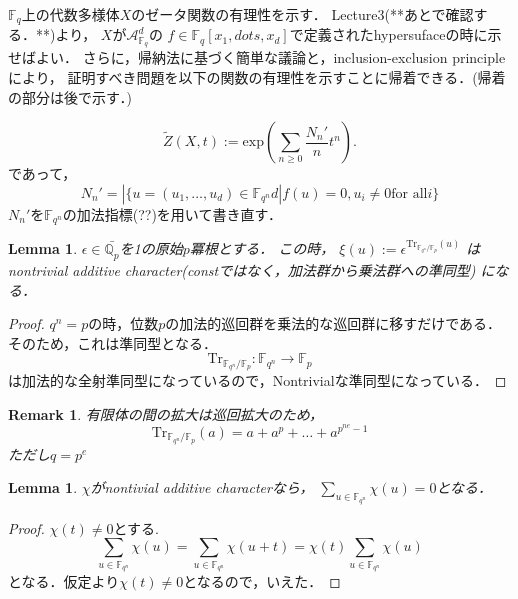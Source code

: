 \documentclass{ujarticle}
\newtheorem{lem}[thm]{Lemma}
\newtheorem*{rem}{Remark}
\begin{document}
$\mathbb{F}_q$上の代数多様体$X$のゼータ関数の有理性を示す．
Lecture3(**あとで確認する．**)より，
$X$が$\mathcal{A}_{\mathbb{F}_q}^d$の
$f \in \mathbb{F}_  q[x_1,dots,x_d]$で定義されたhypersufaceの時に示せばよい．
さらに，帰納法に基づく簡単な議論と，inclusion-exclusion principleにより，
証明すべき問題を以下の関数の有理性を示すことに帰着できる．(帰着の部分は後で示す．)

\begin{equation*}
 \tilde{Z}(X,t):= \mathrm{exp}(\sum_{n \ge 0}\frac{N_n'}{n}t^n).
\end{equation*}
であって，
\begin{equation*}
 N_n'=|\{u= (u_1,\dots,u_d) \in \mathbb{F}_{q^n}d | f(u)=0,u_i \neq 0
 \mbox{for all}i\}
\end{equation*}
$N_n'$を$\mathbb{F}_{q^n}$の加法指標(??)を用いて書き直す．

\begin{lem}
 $ \epsilon \in  \bar{\mathbb{Q}_p}$を1の原始$p$冪根とする．
 この時，
 $\xi(u):=\epsilon^{\mathrm{Tr}_{\mathbb{F}_{q^n}/\mathbb{F}_p}(u)}$
 はnontrivial additive character(constではなく，加法群から乗法群への準同型)
 になる．
\end{lem}
\begin{proof}
$q^n=p$の時，位数$p$の加法的巡回群を乗法的な巡回群に移すだけである．
そのため，これは準同型となる．
\begin{equation*}
  \mathrm{Tr}_{\mathbb{F}_{q^n}/\mathbb{F}_p}:
  \mathbb{F}_{q^n} \to \mathbb{F}_p
\end{equation*}
は加法的な全射準同型になっているので，Nontrivialな準同型になっている．
\end{proof}

\begin{rem}
 有限体の間の拡大は巡回拡大のため，
 \begin{equation*}
   \mathrm{Tr}_{\mathbb{F}_{q^n}/\mathbb{F}_p}(a)=
   a + a^p + \dots + a^{p^{ne}-1}
 \end{equation*}
 ただし$q=p^e$
\end{rem}

\begin{lem}
 $\chi$がnontivial additive characterなら， $\sum_{u \in
 \mathbb{F}_{q^n}}\chi(u)=0$となる．
\end{lem}

\begin{proof}
 $\chi(t) \neq 0$とする.
 \begin{equation*}
   \sum_{u \in \mathbb{F}_{q^n}}\chi(u)=
   \sum_{u \in \mathbb{F}_{q^n}}\chi(u+t)=
   \chi(t)\sum_{u \in \mathbb{F}_{q^n}}\chi(u)
 \end{equation*}
 となる．仮定より$\chi(t) \neq 0$となるので，いえた．
\end{proof}
\end{document}
